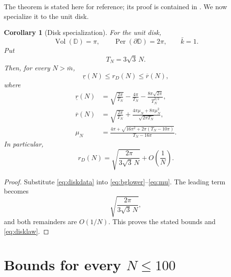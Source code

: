 \documentclass[11pt]{article}
\newtheorem{corollary}[theorem]{Corollary}
\theoremstyle{definition}
\newcommand{\D}{\mathbb{D}}
\newcommand{\vol}{\operatorname{Vol}}
\newcommand{\per}{\operatorname{Per}}
\begin{document}
The theorem is stated here for reference; its proof is contained in
\cite{BirginGardenghiLaurain2024}.  We now specialize it to the unit
disk.

\begin{corollary}[Disk specialization]
\label{cor:diskbounds}
For the unit disk,
\begin{equation}
  \vol(\D)=\pi,\qquad
  \per(\partial\D)=2\pi,\qquad
  \bar k=1.
  \label{eq:diskdata}
\end{equation}
Put
\begin{equation}
  T_N=3\sqrt3\,N.
  \label{eq:TN}
\end{equation}
Then, for every $N>\bar m$,
\begin{equation}
  \underline r(N)\le r_D(N)\le \overline r(N),
  \label{eq:diskinterval}
\end{equation}
where
\begin{align}
  \underline r(N)
  &=
  \sqrt{\frac{2\pi}{T_N}}
  -\frac{4\pi}{T_N}
  -\frac{8\pi\sqrt{2\pi}}{T_N^{3/2}},
  \label{eq:disklower}\\
  \overline r(N)
  &=
  \sqrt{\frac{2\pi}{T_N}}
  +
  \frac{4\pi\mu_N+8\pi\mu_N^2}{\sqrt{2\pi T_N}},
  \label{eq:diskupper}\\
  \mu_N
  &=
  \frac{
    4\pi+\sqrt{16\pi^2+2\pi(T_N-10\pi)}
  }{
    T_N-16\pi
  }.
  \label{eq:dispmu}
\end{align}
In particular,
\begin{equation}
  r_D(N)
  =
  \sqrt{\frac{2\pi}{3\sqrt3\,N}}
  +O\!\left(\frac1N\right).
  \label{eq:disklaw}
\end{equation}
\end{corollary}

\begin{proof}
Substitute \eqref{eq:diskdata} into \eqref{eq:bglower}--\eqref{eq:mu}.
The leading term becomes
\[
  \sqrt{\frac{2\pi}{3\sqrt3\,N}},
\]
and both remainders are $O(1/N)$.  This proves the stated bounds and
\eqref{eq:disklaw}.
\end{proof}

\section{Bounds for every \texorpdfstring{$N\le100$}{N <= 100}}
\label{sec:table}
\end{document}
